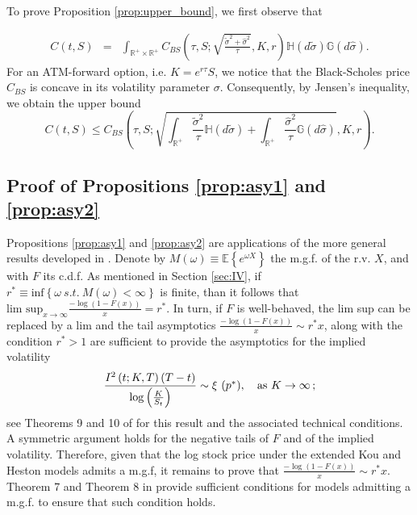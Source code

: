 \documentclass[11pt]{article}
\numberwithin{equation}{section}
\numberwithin{theorem}{section}
\def\G{\mathbb{G}}
\def\H{\mathbb{H}}
\begin{document}
To prove Proposition \ref{prop:upper_bound}, we first observe that 

\begin{eqnarray*}
C\left(t,S\right) & = & \int_{\mathbb{R}^{+}\times\mathbb{R}^{+}}C_{BS}\left(\tau,S;\sqrt{\frac{\tilde{\sigma}^{2}+\hat{\sigma}^{2}}{\tau}},K,r\right)\H\left(d\tilde{\sigma}\right)\G\left(d\hat{\sigma}\right).
\end{eqnarray*}
For an ATM-forward option, i.e. $K=e^{r\tau}S$, we notice
that the Black-Scholes price $C_{BS}$ is concave in its volatility parameter $\sigma$. Consequently, by     Jensen's inequality, we obtain
the upper bound
\[
C(t,S)\leq C_{BS}\left(\tau ,S;\sqrt{\int_{\mathbb{R}^{+}}\frac{\tilde{\sigma}^{2}}{\tau}\H\left(d\tilde{\sigma}\right)+\int_{\mathbb{R}^{+}}\frac{\hat{\sigma}^{2}}{\tau}\G\left(d\hat{\sigma}\right)},K,r\right).
\] 



\subsection{Proof of Propositions \ref{prop:asy1} and \ref{prop:asy2}}\label{app-strike}

Propositions \ref{prop:asy1} and \ref{prop:asy2} are  applications of the more general
results developed in \citet{Benaim2008}. Denote by  $M\left(\omega\right)\equiv\mathbb{E}\left\{ e^{\omega X}\right\} $
the m.g.f. of the r.v. $X$, and with $F$ its c.d.f. As mentioned in
Section \ref{sec:IV}, if $r^{*}\equiv\mbox{inf}\left\{ \omega\ s.t.\ M\left(\omega\right)<\infty\right\} $
is finite, than  it follows  that $\mbox{lim sup}_{x\rightarrow\infty}\frac{-{\log}\left(1-F\left(x\right)\right)}{x}=r^{*}$.
In turn, if $F$ is well-behaved,
the lim sup can be replaced by a lim and the tail asymptotics $\frac{-{\log}\left(1-F\left(x\right)\right)}{x}\sim r^{*}x$,
along with the condition $r^{*}>1$ are sufficient to provide the asymptotics for the implied volatility
\[
\frac{I^{2}\left(t;K,T\right)\left(T-t\right)}{{\log}\left(\frac{K}{S_{t}}\right)}\sim\mbox{\ensuremath{\xi} {\ensuremath{\left(p^{*}\right)}}}, \quad \text{as}\,\, \ensuremath{K}\rightarrow\infty\,;
\] see Theorems 9 and 10 of \citet{Benaim2008} for this result and the associated technical conditions. A symmetric argument holds for the negative
tails of $F$ and of the implied volatility.
Therefore, given that the log stock price under the extended Kou and Heston models  admits
a m.g.f, it remains to prove  that $\frac{-{\log}\left(1-F\left(x\right)\right)}{x}\sim r^{*}x$.
Theorem 7 and Theorem 8 in \citet{Benaim2008} provide sufficient
conditions for models admitting a m.g.f. to ensure that such condition holds. 
\end{document}
